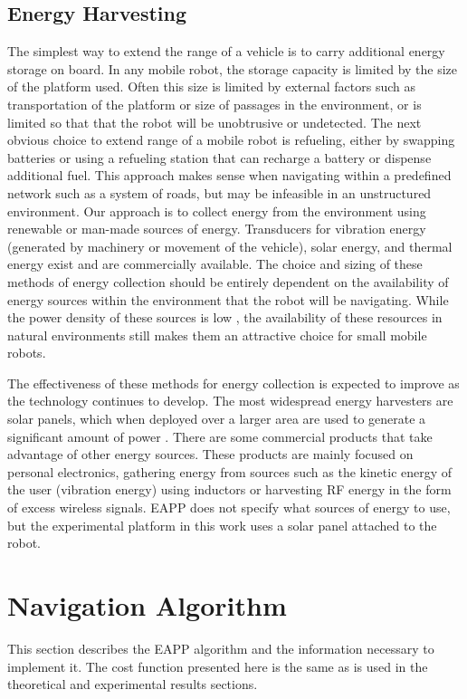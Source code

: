\documentclass[journal]{IEEEtran}
\begin{document}
\subsection{Energy Harvesting}
The simplest way to extend the range of a vehicle is to carry additional energy storage on board. 
In any mobile robot, the storage capacity is limited by the size of the platform used. 
Often this size is limited by external factors such as transportation of the platform or size of passages in the environment, or is limited so that that the robot will be unobtrusive or undetected. 
The next obvious choice to extend range of a mobile robot is refueling, either by swapping batteries or using a refueling station that can recharge a battery or dispense additional fuel. 
This approach makes sense when navigating within a predefined network such as a system of roads, but may be infeasible in an unstructured environment. 
Our approach is to collect energy from the environment using renewable or man-made sources of energy. 
Transducers for vibration energy (generated by machinery or movement of the vehicle)\cite{wickenheiser2010design}, solar energy, and thermal energy exist and are commercially available. 
The choice and sizing of these methods of energy collection should be entirely dependent on the availability of energy sources within the environment that the robot will be navigating. 
While the power density of these sources is low \cite{layton2008comparison}, the availability of these resources in natural environments still makes them an attractive choice for small mobile robots. 

The effectiveness of these methods for energy collection is expected to improve as the technology continues to develop. 
The most widespread energy harvesters are solar panels, which when deployed over a larger area are used to generate a significant amount of power \cite{DoE citation here}. 
There are some commercial products that take advantage of other energy sources. 
These products are mainly focused on personal electronics, gathering energy from sources such as the kinetic energy of the user (vibration energy) using inductors or harvesting RF energy in the form of excess wireless signals. 
EAPP does not specify what sources of energy to use, but the experimental platform in this work uses a solar panel attached to the robot.

\section{Navigation Algorithm}
This section describes the EAPP algorithm and the information necessary to implement it. The cost function presented here is the same as is used in the theoretical and experimental results sections.
\end{document}
